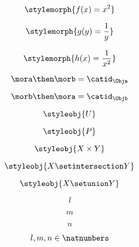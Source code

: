 {\begin{forslides}
		\begin{equation}
			\label{eq:28}
			\stylemorph{f(x) = x^2}
		\end{equation}

		\begin{equation}
			\label{eq:29}
			\stylemorph{g(y) = \frac{1}{y}}
		\end{equation}

		\begin{equation}
			\label{eq:30}
			\stylemorph{h(x) = \frac{1}{x^2}}
		\end{equation}

		\begin{equation}
			\label{eq:31}
			\mora \then \morb = \catid_\Obja
		\end{equation}

		\begin{equation}
			\label{eq:32}
			\morb \then \mora = \catid_\Objb
		\end{equation}

		\begin{equation}
			\label{eq:33}
			\styleobj{U}
		\end{equation}

		\begin{equation}
			\label{eq:34}
			\styleobj{P}
		\end{equation}

		\begin{equation}
			\label{eq:35}
			\styleobj{X \times Y}
		\end{equation}

		\begin{equation}
			\label{eq:36}
			\styleobj{X \setintersection Y}
		\end{equation}

		\begin{equation}
			\label{eq:37}
			\styleobj{X \setunion Y}
		\end{equation}

		\begin{equation}
			\label{eq:38}
			l
		\end{equation}

		\begin{equation}
			\label{eq:39}
			m
		\end{equation}

		\begin{equation}
			\label{eq:40}
			n
		\end{equation}

		\begin{equation}
			\label{eq:41}
			l, m, n \in \natnumbers
		\end{equation}


\end{forslides}}
